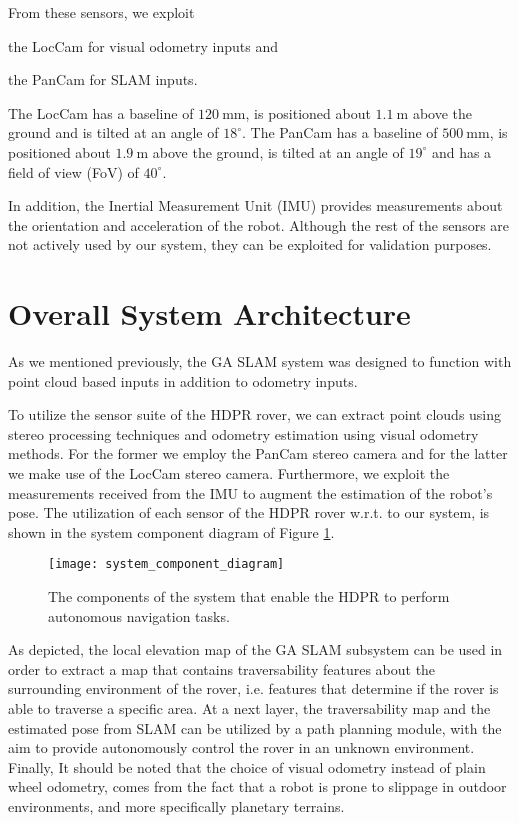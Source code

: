 From these sensors, we exploit
\begin{enumerate*}[label=(\roman*)]
    \item the LocCam for visual odometry inputs and
    \item the PanCam for SLAM inputs.
\end{enumerate*}
The LocCam has a baseline of $\SI{120}{\mm}$, is positioned about
$\SI{1.1}{\m}$ above the ground and is tilted at an angle of $18^{\circ}$.
The PanCam has a baseline of $\SI{500}{\mm}$, is positioned about
$\SI{1.9}{\m}$ above the ground, is tilted at an angle of $19^{\circ}$ and
has a field of view (FoV) of $40^{\circ}$.

In addition, the Inertial Measurement Unit (IMU) provides measurements about
the orientation and acceleration of the robot.
Although the rest of the sensors are not actively used by our system,
they can be exploited for validation purposes.

\section{Overall System Architecture}

As we mentioned previously, the GA SLAM system was designed to function
with point cloud based inputs in addition to odometry inputs.

To utilize the sensor suite of the HDPR rover, we can extract point clouds
using stereo processing techniques and odometry estimation using visual
odometry methods.
For the former we employ the PanCam stereo camera and for the latter we make
use of the LocCam stereo camera.
Furthermore, we exploit the measurements received from the IMU to augment
the estimation of the robot's pose.
The utilization of each sensor of the HDPR rover w.r.t. to our system,
is shown in the system component diagram of Figure
\ref{fig:system_component_diagram}.

\begin{figure}[h!]
    \centering
    \texttt{[image: system\_component\_diagram]}
    \decoRule
    \caption[System component diagram]{
        The components of the system that enable the HDPR to perform
        autonomous navigation tasks.
    }
    \label{fig:system_component_diagram}
\end{figure}

As depicted, the local elevation map of the GA SLAM subsystem can be used
in order to extract a map that contains traversability features about the
surrounding environment of the rover, i.e. features that determine if
the rover is able to traverse a specific area.
At a next layer, the traversability map and the estimated pose from SLAM
can be utilized by a path planning module, with the aim to provide
autonomously control the rover in an unknown environment.
Finally, It should be noted that the choice of visual odometry
instead of plain wheel odometry, comes from the fact that a robot is prone
to slippage in outdoor environments, and more specifically planetary terrains.


